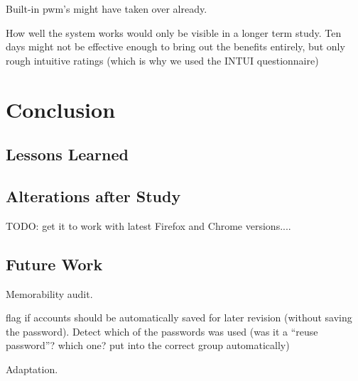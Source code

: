 Built-in pwm's might have taken over already.

How well the system works would only be visible in a longer term study. Ten days might not be effective enough to bring out the benefits entirely, but only rough intuitive ratings (which is why we used the INTUI questionnaire)


\section{Conclusion}

\subsection{Lessons Learned}


\subsection{Alterations after Study}
TODO: get it to work with latest Firefox and Chrome versions....

\subsection{Future Work}
Memorability audit.

flag if accounts should be automatically saved for later revision (without saving the password). Detect which of the passwords was used (was it a ``reuse password''? which one? put into the correct group automatically)

Adaptation. 




